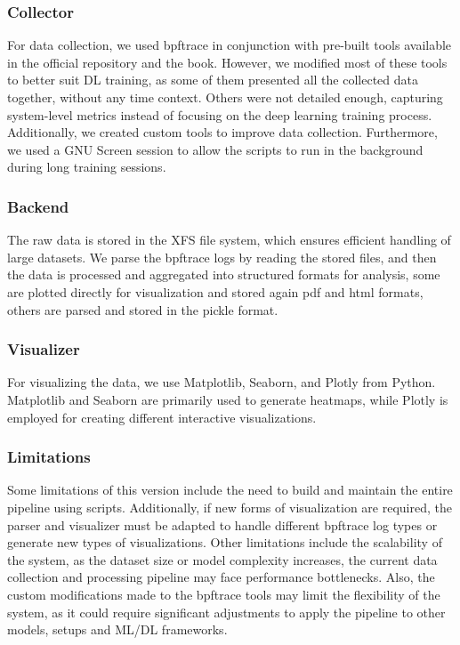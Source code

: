 \documentclass[conference]{IEEEtran}
\begin{document}
\subsubsection{Collector}

For data collection, we used bpftrace\cite{bpftrace} in conjunction with pre-built tools available in the official repository and the book\cite{bgreggBook}. 
However, we modified most of these tools to better suit DL training, as some of them presented all the collected data together, without any time context.
Others were not detailed enough, capturing system-level metrics instead of focusing on the deep learning training process. 
Additionally, we created custom tools to improve data collection. 
Furthermore, we used a GNU Screen \cite{screen} session to allow the scripts to run in the background during long training sessions.

\subsubsection{Backend}
The raw data is stored in the XFS file system, which ensures efficient handling of large datasets.
We parse the bpftrace\cite{bpftrace} logs by reading the stored files, and then the data is processed and aggregated into structured formats for analysis,
some are plotted directly for visualization and stored again pdf and html formats, others are parsed and stored in the pickle format.

\subsubsection{Visualizer}

For visualizing the data, we use Matplotlib, Seaborn, and Plotly from Python.
Matplotlib and Seaborn are primarily used to generate heatmaps, while Plotly is employed for creating different interactive visualizations.

\subsubsection{Limitations}

Some limitations of this version include the need to build and maintain the entire pipeline using scripts.
Additionally, if new forms of visualization are required, the parser and visualizer must be adapted to handle different bpftrace log types or generate new types of visualizations.
Other limitations include the scalability of the system, as the dataset size or model complexity increases, the current data collection and processing pipeline may face performance bottlenecks.
Also, the custom modifications made to the bpftrace tools may limit the flexibility of the system, as it could require significant adjustments to apply the pipeline to other models, setups and ML/DL frameworks.
\end{document}
